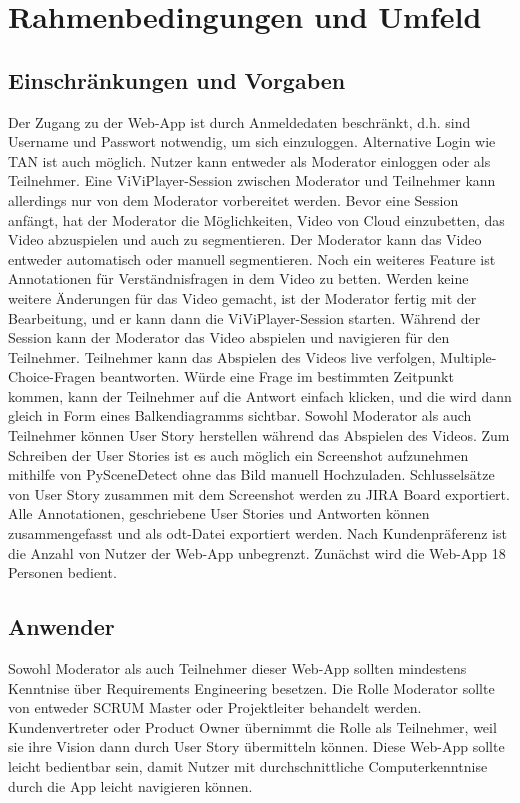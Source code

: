 \section{Rahmenbedingungen und Umfeld}

\subsection{Einschränkungen und Vorgaben}
Der Zugang zu der Web-App ist durch Anmeldedaten beschränkt, d.h. sind Username und Passwort notwendig, um sich einzuloggen. Alternative Login wie TAN ist auch möglich. 
Nutzer kann entweder als Moderator einloggen oder als Teilnehmer. Eine ViViPlayer-Session zwischen Moderator und Teilnehmer kann allerdings nur von dem Moderator 
vorbereitet werden.\linebreak
\linebreak
Bevor eine Session anfängt, hat der Moderator die Möglichkeiten, Video von Cloud einzubetten, das Video abzuspielen und auch zu segmentieren. Der Moderator kann 
das Video entweder automatisch oder manuell segmentieren. Noch ein weiteres Feature ist Annotationen für Verständnisfragen in dem Video zu betten. Werden keine 
weitere Änderungen für das Video gemacht, ist der Moderator fertig mit der Bearbeitung, und er kann dann die ViViPlayer-Session starten.\linebreak
\linebreak
Während der Session kann der Moderator das Video abspielen und navigieren für den Teilnehmer. Teilnehmer kann das Abspielen des Videos live verfolgen, Multiple-Choice-Fragen 
beantworten. Würde eine Frage im bestimmten Zeitpunkt kommen, kann der Teilnehmer auf die Antwort einfach klicken, und die wird dann gleich in Form eines Balkendiagramms sichtbar. 
Sowohl Moderator als auch Teilnehmer können User Story herstellen während das Abspielen des Videos. Zum Schreiben der User Stories ist es auch möglich ein Screenshot aufzunehmen 
mithilfe von PySceneDetect ohne das Bild manuell Hochzuladen. Schlusselsätze von User Story zusammen mit dem Screenshot werden zu JIRA Board exportiert. 
Alle Annotationen, geschriebene User Stories und Antworten können zusammengefasst und als odt-Datei exportiert werden.\linebreak
\linebreak
Nach Kundenpräferenz ist die Anzahl von Nutzer der Web-App unbegrenzt. Zunächst wird die Web-App 18 Personen bedient.

\subsection{Anwender}
Sowohl Moderator als auch Teilnehmer dieser Web-App sollten mindestens Kenntnise über Requirements Engineering besetzen. Die Rolle Moderator sollte von entweder SCRUM Master 
oder Projektleiter behandelt werden. Kundenvertreter oder Product Owner übernimmt die Rolle als Teilnehmer, weil sie ihre Vision dann durch User Story übermitteln können. 
Diese Web-App sollte leicht bedientbar sein, damit Nutzer mit durchschnittliche Computerkenntnise durch die App leicht navigieren können.

